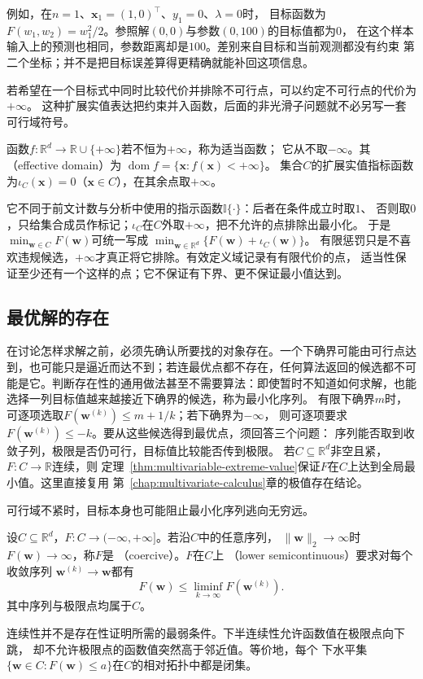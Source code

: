例如，在$n=1$、$\bm{x}_1=(1,0)^\top$、$y_1=0$、$\lambda=0$时，
目标函数为$F(w_1,w_2)=w_1^2/2$。参照解$(0,0)$与参数$(0,100)$的目标值都为$0$，
在这个样本输入上的预测也相同，参数距离却是$100$。差别来自目标和当前观测都没有约束
第二个坐标；并不是把目标误差算得更精确就能补回这项信息。

若希望在一个目标式中同时比较代价并排除不可行点，可以约定不可行点的代价为$+\infty$。
这种扩展实值表达把约束并入函数，后面的非光滑子问题就不必另写一套可行域符号。
\begin{definition}
\label{def:opt-proper-domain-indicator}
函数$f:\mathbb R^d\to\mathbb R\cup\{+\infty\}$若不恒为$+\infty$，称为适当函数；
它从不取$-\infty$。其（effective domain）为
$\operatorname{dom}f=\{\bm x:f(\bm x)<+\infty\}$。
集合$C$的扩展实值指标函数为$\iota_C(\bm x)=0$（$\bm x\in C$），在其余点取$+\infty$。
\end{definition}
它不同于前文计数与分析中使用的指示函数$\mathbb I\{\cdot\}$：后者在条件成立时取$1$、
否则取$0$，只给集合成员作标记；$\iota_C$在$C$外取$+\infty$，把不允许的点排除出最小化。
于是$\min_{\bm w\in C}F(\bm w)$可统一写成
$\min_{\bm w\in\mathbb R^d}\{F(\bm w)+\iota_C(\bm w)\}$。
有限惩罚只是不喜欢违规候选，$+\infty$才真正将它排除。有效定义域记录有有限代价的点，
适当性保证至少还有一个这样的点；它不保证有下界、更不保证最小值达到。

\subsection{最优解的存在}
\label{sec:opt-existence}

在讨论怎样求解之前，必须先确认所要找的对象存在。一个下确界可能由可行点达到，也可能只是逼近而达不到；若连最优点都不存在，任何算法返回的候选都不可能是它。判断存在性的通用做法甚至不需要算法：即使暂时不知道如何求解，也能选择一列目标值越来越接近下确界的候选，称为最小化序列。
有限下确界$m$时，可逐项选取$F(\bm w^{(k)})\leq m+1/k$；若下确界为$-\infty$，
则可逐项要求$F(\bm w^{(k)})\leq-k$。要从这些候选得到最优点，须回答三个问题：
序列能否取到收敛子列，极限是否仍可行，目标值比较能否传到极限。
若$C\subseteq\mathbb{R}^d$非空且紧，$F:C\to\mathbb{R}$连续，则
定理~\ref{thm:multivariable-extreme-value}保证$F$在$C$上达到全局最小值。这里直接复用
第~\ref{chap:multivariate-calculus}章的极值存在结论。

可行域不紧时，目标本身也可能阻止最小化序列逃向无穷远。
\begin{definition}[强制性与下半连续性]
\label{def:opt-coercive-lower-semicontinuous}
设$C\subseteq\mathbb R^d$，$F:C\to(-\infty,+\infty]$。若沿$C$中的任意序列，
$\lVert\bm{w}\rVert_2\to\infty$时$F(\bm{w})\to\infty$，称$F$是
（coercive）。$F$在$C$上
（lower semicontinuous）要求对每个收敛序列
$\bm{w}^{(k)}\to\bm{w}$都有
\[
  F(\bm{w})\leq\liminf_{k\to\infty}F(\bm{w}^{(k)}).
\]
其中序列与极限点均属于$C$。
\end{definition}
连续性并不是存在性证明所需的最弱条件。下半连续性允许函数值在极限点向下跳，
却不允许极限点的函数值突然高于邻近值。等价地，每个
下水平集$\{\bm{w}\in C:F(\bm{w})\leq a\}$在$C$的相对拓扑中都是闭集。

